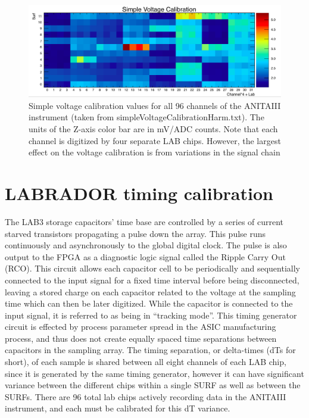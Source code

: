 			
	\begin{figure}
		\centering
		\includegraphics[width=\textwidth]{figures/ADCtoVolts.png}
		\caption{Simple voltage calibration values for all 96 channels of the ANITAIII instrument (taken from simpleVoltageCalibrationHarm.txt).  The units of the Z-axis color bar are in mV/ADC counts.  Note that each channel is digitized by four separate LAB chips.  However, the largest effect on the voltage calibration is from variations in the signal chain}
		\label{fig:adcTomV}
	\end{figure}
		



\section{LABRADOR timing calibration}
		The LAB3 storage capacitors' time base are controlled by a series of current starved transistors propagating a pulse down the array.  This pulse runs continuously and asynchronously to the global digital clock.  The pulse is also output to the FPGA as a diagnostic logic signal called the Ripple Carry Out (RCO).  This circuit allows each capacitor cell to be periodically and sequentially connected to the input signal for a fixed time interval before being disconnected, leaving a stored charge on each capacitor related to the voltage at the sampling time which can then be later digitized.  While the capacitor is connected to the input signal, it is referred to as being in ``tracking mode''.  This timing generator circuit is effected by process parameter spread in the ASIC manufacturing process, and thus does not create equally spaced time separations between capacitors in the sampling array.  The timing separation, or delta-times (dTs for short), of each sample is shared between all eight channels of each LAB chip, since it is generated by the same timing generator, however it can have significant variance between the different chips within a single SURF as well as between the SURFs.  There are 96 total lab chips actively recording data in the ANITAIII instrument, and each must be calibrated for this dT variance.

